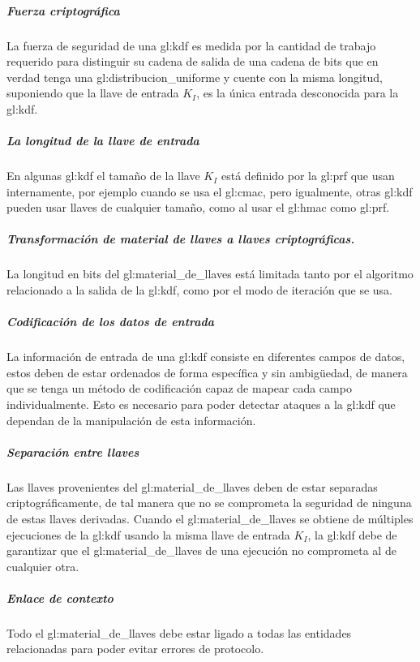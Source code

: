 \subparagraph{Fuerza criptográfica}
La fuerza de seguridad de una \gls{gl:kdf} es medida por la cantidad de
trabajo requerido para distinguir su cadena de salida de una cadena de bits
que en verdad tenga una \gls{gl:distribucion_uniforme} y cuente con la misma
longitud, suponiendo que la llave de entrada $K_I$, es la única entrada
desconocida para la \gls{gl:kdf}.

\subparagraph{La longitud de la llave de entrada}
En algunas \gls{gl:kdf} el tamaño de la llave $K_I$ está definido por la
\gls{gl:prf} que usan internamente, por ejemplo cuando se usa el \gls{gl:cmac},
pero igualmente, otras \gls{gl:kdf} pueden usar llaves de cualquier tamaño,
como al usar el \gls{gl:hmac} como \gls{gl:prf}.

\subparagraph{Transformación de material de llaves a llaves criptográficas.}
La longitud en bits del \gls{gl:material_de_llaves} está limitada tanto por
el algoritmo relacionado a la salida de la \gls{gl:kdf}, como por el modo de
iteración que se usa.

\subparagraph{Codificación de los datos de entrada}
La información de entrada de una \gls{gl:kdf} consiste en diferentes campos
de datos, estos deben de estar ordenados de forma específica y sin ambigüedad,
de manera que se tenga un método de codificación capaz de mapear cada campo
individualmente. Esto es necesario para poder detectar ataques a la
\gls{gl:kdf} que dependan de la manipulación de esta información.

\subparagraph{Separación entre llaves}
Las llaves provenientes del \gls{gl:material_de_llaves} deben de estar
separadas criptográficamente, de tal manera que no se comprometa la seguridad
de ninguna de estas llaves derivadas. Cuando el \gls{gl:material_de_llaves}
se obtiene de múltiples ejecuciones de la \gls{gl:kdf} usando la misma llave
de entrada $K_I$, la \gls{gl:kdf} debe de garantizar que el
\gls{gl:material_de_llaves} de una ejecución no comprometa al de cualquier
otra.

\subparagraph{Enlace de contexto}
Todo el \gls{gl:material_de_llaves} debe estar ligado a todas las entidades
relacionadas para poder evitar errores de protocolo.
